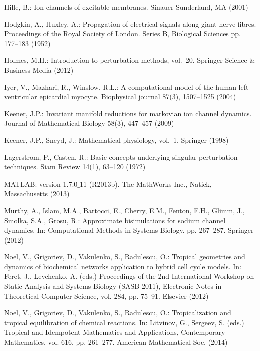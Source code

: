 \documentclass{llncs}
\begin{document}
\begin{thebibliography}{10}
Hille, B.: Ion channels of excitable membranes. Sinauer Sunderland, MA (2001)

Hodgkin, A., Huxley, A.: Propagation of electrical signals along giant nerve
  fibres. Proceedings of the Royal Society of London. Series B, Biological
  Sciences pp. 177--183 (1952)

Holmes, M.H.: Introduction to perturbation methods, vol.~20. Springer Science
  \& Business Media (2012)

Iyer, V., Mazhari, R., Winslow, R.L.: A computational model of the human
  left-ventricular epicardial myocyte. Biophysical journal  87(3),  1507--1525
  (2004)

Keener, J.P.: Invariant manifold reductions for markovian ion channel dynamics.
  Journal of Mathematical Biology  58(3),  447--457 (2009)

Keener, J.P., Sneyd, J.: Mathematical physiology, vol.~1. Springer (1998)

Lagerstrom, P., Casten, R.: Basic concepts underlying singular perturbation
  techniques. Siam Review  14(1),  63--120 (1972)

MATLAB: {version 1.7.0$\_$11 (R2013b)}. The MathWorks Inc., Natick,
  Massachusetts (2013)

Murthy, A., Islam, M.A., Bartocci, E., Cherry, E.M., Fenton, F.H., Glimm, J.,
  Smolka, S.A., Grosu, R.: Approximate bisimulations for sodium channel
  dynamics. In: Computational Methods in Systems Biology. pp. 267--287.
  Springer (2012)

Noel, V., Grigoriev, D., Vakulenko, S., Radulescu, O.: Tropical geometries and
  dynamics of biochemical networks application to hybrid cell cycle models. In:
  Feret, J., Levchenko, A. (eds.) Proceedings of the 2nd International Workshop
  on Static Analysis and Systems Biology ({SASB} 2011), Electronic Notes in
  Theoretical Computer Science, vol. 284, pp. 75--91. Elsevier (2012)

Noel, V., Grigoriev, D., Vakulenko, S., Radulescu, O.: Tropicalization and
  tropical equilibration of chemical reactions. In: Litvinov, G., Sergeev, S.
  (eds.) Tropical and Idempotent Mathematics and Applications, Contemporary
  Mathematics, vol. 616, pp. 261--277. American Mathematical Soc. (2014)


\end{thebibliography}
\end{document}
